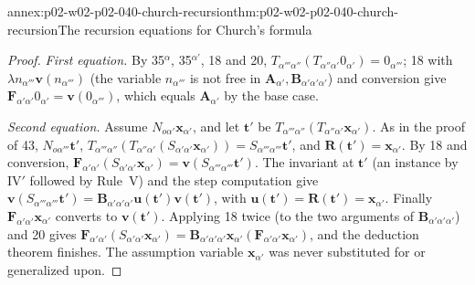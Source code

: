 \begin{annexitem}{annex:p02-w02-p02-040-church-recursion}{thm:p02-w02-p02-040-church-recursion}{The recursion equations for Church's formula}
\begin{proof}
\emph{First equation.}  By 35\(^\alpha\), 35\(^{\alpha'}\), 18 and 20,
\(T_{\alpha'''\alpha''}(T_{\alpha''\alpha'}0_{\alpha'})=0_{\alpha'''}\); 18 with
\(\lambda n_{\alpha'''}\mathbf v(n_{\alpha'''})\) (the variable \(n_{\alpha'''}\)
is not free in \(\mathbf A_{\alpha'},\mathbf B_{\alpha'\alpha'\alpha'}\)) and
conversion give \(\mathbf F_{\alpha'\alpha'}0_{\alpha'}=\mathbf v(0_{\alpha'''})\),
which equals \(\mathbf A_{\alpha'}\) by the base case.

\emph{Second equation.}  Assume \(N_{o\alpha'}\mathbf x_{\alpha'}\), and let
\(\mathbf t'\) be \(T_{\alpha'''\alpha''}(T_{\alpha''\alpha'}\mathbf x_{\alpha'})\).  As
in the proof of 43, \(N_{o\alpha'''}\mathbf t'\),
\(T_{\alpha'''\alpha''}(T_{\alpha''\alpha'}(S_{\alpha'\alpha'}\mathbf x_{\alpha'}))=S_{\alpha'''\alpha'''}\mathbf t'\),
and \(\mathbf R(\mathbf t')=\mathbf x_{\alpha'}\).  By 18 and conversion,
\(\mathbf F_{\alpha'\alpha'}(S_{\alpha'\alpha'}\mathbf x_{\alpha'})=\mathbf v(S_{\alpha'''\alpha'''}\mathbf t')\).
The invariant at \(\mathbf t'\) (an instance by IV\('\) followed by Rule~V) and
the step computation give
\(\mathbf v(S_{\alpha'''\alpha'''}\mathbf t')=\mathbf B_{\alpha'\alpha'\alpha'}\mathbf u(\mathbf t')\mathbf v(\mathbf t')\),
with \(\mathbf u(\mathbf t')=\mathbf R(\mathbf t')=\mathbf x_{\alpha'}\).  Finally
\(\mathbf F_{\alpha'\alpha'}\mathbf x_{\alpha'}\) converts to \(\mathbf v(\mathbf t')\).
Applying 18 twice (to the two arguments of \(\mathbf B_{\alpha'\alpha'\alpha'}\))
and 20 gives
\(\mathbf F_{\alpha'\alpha'}(S_{\alpha'\alpha'}\mathbf x_{\alpha'})=
\mathbf B_{\alpha'\alpha'\alpha'}\mathbf x_{\alpha'}(\mathbf F_{\alpha'\alpha'}\mathbf x_{\alpha'})\),
and the deduction theorem finishes.  The assumption variable
\(\mathbf x_{\alpha'}\) was never substituted for or generalized upon.


\end{proof}
\end{annexitem}
